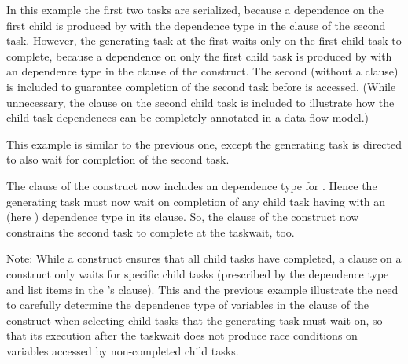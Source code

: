 

In this example the first two tasks are serialized, because a dependence on
the first child is produced by  with the  dependence type
in the  clause of the second task.
However, the generating task at the first  waits only on the
first child task to complete, because a dependence on only the first child task
is produced by  with an  dependence type in the
 clause of the  construct.
The second  (without a  clause) is included
to guarantee completion of the second task before  is accessed.
(While unnecessary, the  clause on the second child task is
included to illustrate how the child task dependences can be completely annotated
in a data-flow model.)



\clearpage


This example is similar to the previous one, except the generating task is
directed to also wait for completion of the second task.

The  clause of the  construct now includes an
 dependence type for .  Hence the generating task must now
wait on completion of any child task having  with an 
(here ) dependence type in its  clause.
So, the  clause of the  construct now constrains
the second task to complete at the taskwait, too.

Note: While a  construct ensures that all child tasks have completed, a  clause on a 
construct only waits for specific child tasks (prescribed by the dependence type and list
items in the 's  clause).
This and the previous example illustrate the need to carefully determine
the dependence type of variables in the  clause of the  construct
when selecting child tasks that the generating task must wait on, so that its execution after the
taskwait does not produce race conditions on variables accessed by non-completed child tasks.



